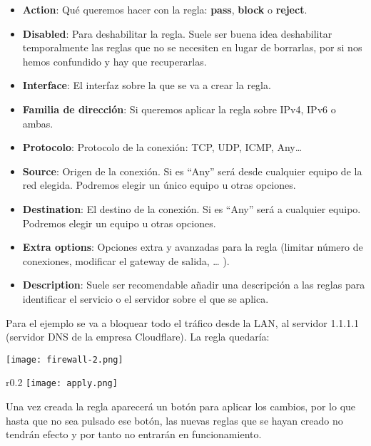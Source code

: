 \begin{itemize}
    \item \textbf{Action}: Qué queremos hacer con la regla: \textbf{pass}, \textbf{block} o \textbf{reject}.
    \item \textbf{Disabled}: Para deshabilitar la regla. Suele ser buena idea deshabilitar temporalmente las reglas que no se necesiten en lugar de borrarlas, por si nos hemos confundido y hay que recuperarlas.
    \item \textbf{Interface}: El interfaz sobre la que se va a crear la regla.
    \item \textbf{Familia de dirección}: Si queremos aplicar la regla sobre IPv4, IPv6 o ambas.
    \item \textbf{Protocolo}: Protocolo de la conexión: TCP, UDP, ICMP, Any…
    \item \textbf{Source}: Origen de la conexión. Si es “Any” será desde cualquier equipo de la red elegida. Podremos elegir un único equipo u otras opciones.
    \item \textbf{Destination}: El destino de la conexión. Si es “Any” será a cualquier equipo. Podremos elegir un equipo u otras opciones.
    \item \textbf{Extra options}: Opciones extra y avanzadas para la regla (limitar número de conexiones, modificar el gateway de salida, … ).
    \item \textbf{Description}: Suele ser recomendable añadir una descripción a las reglas para identificar el servicio o el servidor sobre el que se aplica.
\end{itemize}

Para el ejemplo se va a bloquear todo el tráfico desde la LAN, al servidor 1.1.1.1 (servidor DNS de la empresa Cloudflare). La regla quedaría:

\begin{center}
    \vspace{-10pt}
    \texttt{[image: firewall-2.png]}
    \vspace{-20pt}
\end{center}


\begin{wrapfigure}{r}{0.2\linewidth}
    \centering
    \vspace{-10pt}
    \texttt{[image: apply.png]}
\end{wrapfigure}
Una vez creada la regla aparecerá un botón para aplicar los cambios, por lo que hasta que no sea pulsado ese botón, las nuevas reglas que se hayan creado no tendrán efecto y por tanto no entrarán en funcionamiento.



